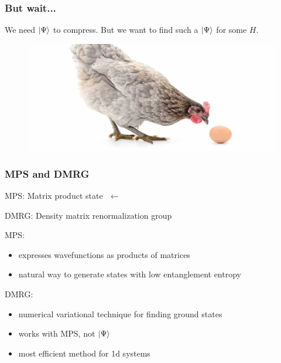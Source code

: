 \documentclass{beamer}
\theoremstyle{definition}
\begin{document}
\begin{frame}
	\frametitle{But wait...}
		
	We need $\ket{\Psi}$ to compress. But we want to find such a $\ket{\Psi}$ for some $H$. \\
	
	\pause
	
	\vspace{15pt}
	
	\begin{figure}[!htb]
		\centering
		\includegraphics[scale=0.2]{chickenegg.jpg}
	\end{figure}
	
	\vspace{8pt}

\end{frame}





\begin{frame}
	\frametitle{MPS and DMRG}
	MPS: Matrix product state $\,\,\leftarrow$ \\
	
	\vspace{8pt}
	
	DMRG: Density matrix renormalization group\\
	
	\vspace{8pt}
	
	\pause
	
	
	\vspace{12pt}
	
	MPS: 
	\begin{itemize}
		\item expresses wavefunctions as products of matrices
		
		\item natural way to generate states with low entanglement entropy
	\end{itemize}
\pause

	DMRG:
	\begin{itemize}
		\item numerical variational technique for finding ground states
		
		\item works with MPS, not $\ket{\Psi}$
		
		\item most efficient method for 1d systems
	\end{itemize}
	
	
\end{frame}
\end{document}
